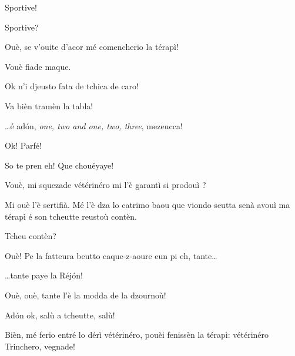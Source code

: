 \begin{drama}
\Mariettospeaks Sportive!

\Cienspeaks Sportive?
  
\Maracanaspeaks Ouè, se v'ouite d’acor mé comencherio la térapì!

\Cienspeaks Vouè fiade maque.

\Maracanaspeaks Ok n'i djeusto fata de tchica de caro!

\Mariettospeaks Va bièn tramèn la tabla!


\Mariettospeaks \ldots é ad\'on, \textit{one, two and one, two, three}, mezeucca!





\Maracanaspeaks Ok! Parfé!

\Mariettospeaks So te pren eh! Que chouéyaye!

\Cienspeaks Vouè, mi squezade vétérinéro mi l’è garantì si prodouì ?

\Maracanaspeaks Mi ouè l’è sertifià. Mé l’è dza lo catrimo baou que viondo seutta senà avouì ma térapì é son tcheutte reustoù contèn. 

\Cienspeaks Tcheu contèn?

\Maracanaspeaks Ouè! Pe la fatteura beutto caque-z-aoure eun pi eh, tante\ldots

\Mariettospeaks \ldots tante paye la Réjón!

\Cienspeaks Ouè, ouè, tante l'è la modda de la dzournoù!

\Mariettospeaks Ad\'on ok, salù a tcheutte, salù!



\Chefspeaks Bièn, mé ferio entré lo dérì vétérinéro, pouèi fenissèn la térapì: vétérinéro Trinchero, vegnade!


\end{drama}
